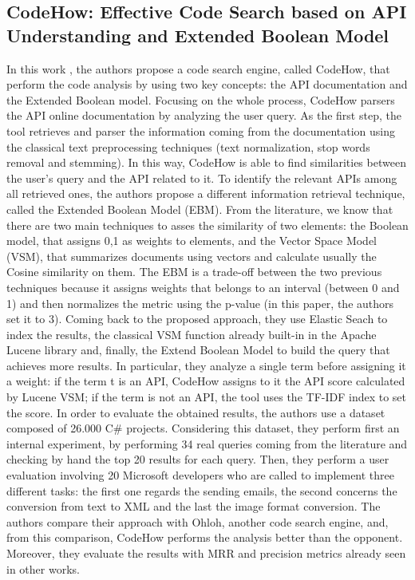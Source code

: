 \subsection{CodeHow: Effective Code Search based on API Understanding and Extended Boolean Model}
In this work \cite{DBLP:conf/kbse/LvZLWZZ15}, the authors propose a code search engine, called CodeHow, that perform the code analysis by using two key concepts: the API documentation and the Extended Boolean model. Focusing on the whole process, CodeHow parsers the API online documentation by analyzing the user query. As the first step, the tool retrieves and parser the information coming from the documentation using the classical text preprocessing techniques (text normalization, stop words removal and stemming). In this way, CodeHow is able to find similarities between the user’s query and the API related to it. To identify the relevant APIs among all retrieved ones, the authors propose a different information retrieval technique, called the Extended Boolean Model (EBM). From the literature, we know that there are two main techniques to asses the similarity of two elements: the Boolean model, that assigns 0,1 as weights to elements, and the Vector Space Model (VSM), that summarizes documents using vectors and calculate usually the Cosine similarity on them. The EBM is a trade-off between the two previous techniques because it assigns weights that belongs to an interval (between 0 and 1) and then normalizes the metric using the p-value (in this paper, the authors set it to 3).
Coming back to the proposed approach, they use Elastic Seach to index the results, the classical VSM function already built-in in the Apache Lucene library and, finally, the Extend Boolean Model to build the query that achieves more results. In particular, they analyze a single term before assigning it a weight: if the term t is an API, CodeHow assigns to it the API score calculated by Lucene VSM; if the term is not an API, the tool uses the TF-IDF index to set the score. In order to evaluate the obtained results, the authors use a dataset composed of 26.000 C\# projects. Considering this dataset, they perform first an internal experiment, by performing 34 real queries coming from the literature and checking by hand the top 20 results for each query. Then, they perform a user evaluation involving 20 Microsoft developers who are called to implement three different tasks: the first one regards the sending emails, the second concerns the conversion from text to XML and the last the image format conversion. The authors compare their approach with Ohloh, another code search engine, and, from this comparison, CodeHow performs the analysis better than the opponent. Moreover, they evaluate the results with MRR and precision metrics already seen in other works.  


